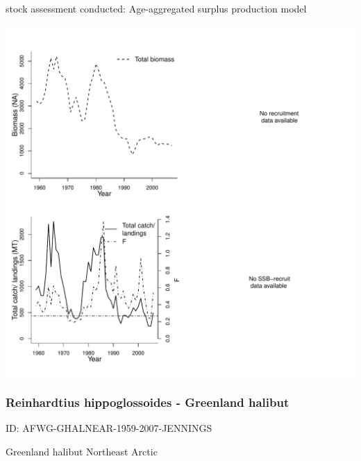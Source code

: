 stock assessment conducted: Age-aggregated surplus production model 
\begin{center}
\vspace{-0.2cm}\includegraphics[scale=0.65]{../tex/figures/plot-RIDEM-WINFLOUNDRI-1959-2007-COLLIE.pdf}
\end{center}

\newpage
\subsubsection{Reinhardtius hippoglossoides - Greenland halibut}
ID: AFWG-GHALNEAR-1959-2007-JENNINGS

Greenland halibut Northeast Arctic 

